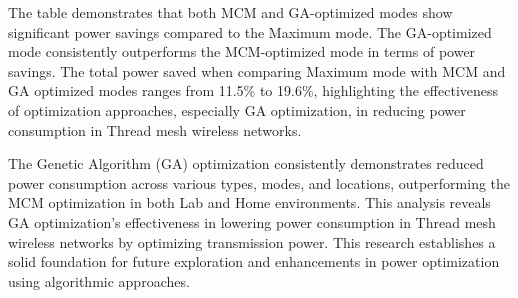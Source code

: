 The table demonstrates that both MCM and GA-optimized modes show significant power savings compared to the Maximum mode. The GA-optimized mode consistently outperforms the MCM-optimized mode in terms of power savings. The total power saved when comparing Maximum mode with MCM and GA optimized modes ranges from 11.5\% to 19.6\%, highlighting the effectiveness of optimization approaches, especially GA optimization, in reducing power consumption in Thread mesh wireless networks.

\vspace{2mm}
The Genetic Algorithm (GA) optimization consistently demonstrates reduced power consumption across various types, modes, and locations, outperforming the MCM optimization in both Lab and Home environments. This analysis reveals GA optimization's effectiveness in lowering power consumption in Thread mesh wireless networks by optimizing transmission power. This research establishes a solid foundation for future exploration and enhancements in power optimization using algorithmic approaches.
